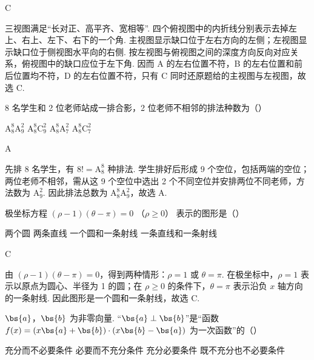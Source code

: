 \begin{answer}
C
\end{answer}

\begin{solution}
三视图满足“长对正、高平齐、宽相等”. 四个俯视图中的内折线分别表示去掉左上、右上、左下、右下的一个角. 主视图显示缺口位于左右方向的左侧；左视图显示缺口位于侧视图水平向的右侧. 按左视图与俯视图之间的深度方向反向对应关系，俯视图中的缺口应位于左下角. 因而 A 的左右位置不符，B 的左右位置和前后位置均不符，D 的左右位置不符，只有 C 同时还原题给的主视图与左视图，故选 C.
\end{solution}

\begin{problem}
8 名学生和 2 位老师站成一排合影，2 位老师不相邻的排法种数为（\quad）

\choices
    {\(\mathrm{A}_8^8\mathrm{A}_9^2\)}
    {\(\mathrm{A}_8^8\mathrm{C}_9^2\)}
    {\(\mathrm{A}_8^8\mathrm{A}_7^2\)}
    {\(\mathrm{A}_8^8\mathrm{C}_7^2\)}
\end{problem}

\begin{answer}
A
\end{answer}

\begin{solution}
先排 8 名学生，有 \(8!=\mathrm{A}_{8}^{8}\) 种排法. 学生排好后形成 9 个空位，包括两端的空位；两位老师不相邻，需从这 9 个空位中选出 2 个不同空位并安排两位不同老师，方法数为 \(\mathrm{A}_{9}^{2}\). 因此排法总数为 \(\mathrm{A}_{8}^{8}\mathrm{A}_{9}^{2}\)，故选 A.
\end{solution}

\begin{problem}
极坐标方程 \((\rho - 1)(\theta - \pi) = 0\) （\(\rho \geqslant 0\)） 表示的图形是（\quad）

\choices
    {两个圆}
    {两条直线}
    {一个圆和一条射线}
    {一条直线和一条射线}
\end{problem}

\begin{answer}
C
\end{answer}

\begin{solution}
由 \((\rho-1)(\theta-\pi)=0\)，得到两种情形：\(\rho=1\) 或 \(\theta=\pi\). 在极坐标中，\(\rho=1\) 表示以原点为圆心、半径为 1 的圆；在 \(\rho\geqslant0\) 的条件下，\(\theta=\pi\) 表示沿负 \(x\) 轴方向的一条射线. 因此图形是一个圆和一条射线，故选 C.
\end{solution}

\begin{problem}
\(\bs{a}\)，\(\bs{b}\) 为非零向量. “\(\bs{a} \perp \bs{b}\)”是“函数 \( f(x) = (x\bs{a} + \bs{b}) \cdot (x\bs{b} - \bs{a}) \) 为一次函数”的（\quad）

\choices
    {充分而不必要条件}
    {必要而不充分条件}
    {充分必要条件}
    {既不充分也不必要条件}
\end{problem}

